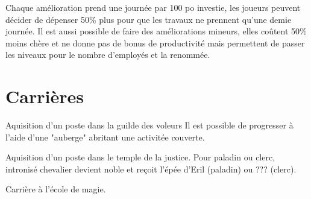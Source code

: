 Chaque amélioration prend une journée par 100 po investie, les joueurs peuvent décider 
de dépenser 50\% plus pour que les travaux ne prennent qu'une demie journée. Il est 
aussi possible de faire des améliorations mineurs, elles coûtent 50\% moins chère
et ne donne pas de bonus de productivité mais permettent de passer les niveaux pour
le nombre d'employés et la renommée.

\section*{Carrières}

Aquisition d'un poste dans la guilde des voleurs
Il est possible de progresser à l'aide d'une "auberge" abritant une activitée couverte.

Aquisition d'un poste dans le temple de la justice.
Pour paladin ou clerc, intronisé chevalier devient noble et reçoit l'épée d'Eril (paladin) ou ??? (clerc).

Carrière à l'école de magie.


